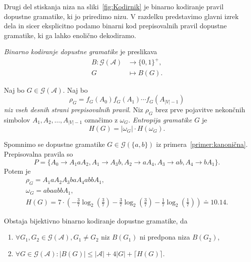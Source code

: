 \documentclass[fin1, tisk]{fmfdelo}
\providecommand{\abs}[1]{\left\lvert #1 \right\rvert}
\newcommand{\A}{\mathcal{A}}
\newcommand{\G}{\mathcal{G}}
\theoremstyle{definition}
\begin{document}
Drugi del stiskanja niza na sliki~\ref{fig:Kodirnik} je binarno kodiranje pravil dopustne
gramatike, ki jo priredimo nizu. V razdelku predstavimo glavni izrek dela in sicer eksplicitno
podamo binarni kod prepisovalnih pravil dopustne gramatike, ki ga lahko enolično dekodiramo.

\begin{definicija}
    \emph{Binarno kodiranje dopustne gramatike} je preslikava 
    \begin{align*}
        B \colon \G(\A) &\to \{ 0, 1 \}^+, \\
        G &\mapsto B(G).
    \end{align*}
\end{definicija} 

\begin{definicija}
    Naj bo $G \in \G(\A)$. Naj bo 
    \[
        \rho_G = f_G(A_0)f_G(A_1) \cdots f_G(A_{\abs{V}-1})
    \]
    \emph{niz vseh desnih strani prepisovalnih pravil}. Niz $\rho_G$ brez prve pojavitve
    nekončnih simbolov $A_1, A_2, \ldots, A_{\abs{V}-1}$ označimo z $\omega_G$.
    \emph{Entropija gramatike $G$} je 
    \[
        H(G) = \abs{\omega_G} \cdot H(\omega_G).
    \]
\end{definicija}

\begin{primer}\label{primer:EntropijaGramatike}
    Spomnimo se dopustne gramatike $G \in \G(\{ a,b \})$ iz primera~\ref{primer:kanonična}. 
    Prepisovalna pravila so
    \[
        P = \{ A_0 \rightarrow A_1aA_2, A_1 \rightarrow A_3b, A_2 \rightarrow aA_4,
        A_3 \rightarrow ab, A_4 \rightarrow bA_1 \}.
    \]
    Potem je 
    \begin{gather*}
        \rho_G = A_1aA_2A_3baA_4abbA_1, \\
        \omega_G = abaabbA_1, \\
        H(G) = 7 \cdot 
        \left(
        - \frac{3}{7} \log_2 \left( \frac{3}{7} \right) 
        - \frac{3}{7} \log_2 \left( \frac{3}{7} \right)
        - \frac{1}{7} \log_2 \left( \frac{1}{7} \right)
        \right)
        \doteq 10.14.
    \end{gather*}
\end{primer}

\begin{izrek}\label{izrek:BinarnoKodiranje}
    Obstaja bijektivno binarno kodiranje dopustne gramatike, da
    \begin{enumerate}
        \item $ \forall G_1, G_2 \in \G(\A), G_1 \neq G_2 $ niz $B(G_1)$ ni predpona niza $B(G_2)$,
        \item $ \forall G \in \G(\A) \colon \abs{B(G)} \leq \abs{\A} + 4 \abs{G} + \lceil H(G) \rceil$.
    \end{enumerate}
\end{izrek}
\end{document}
